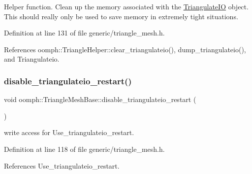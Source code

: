 Helper function. Clean up the memory associated with the \hyperlink{structoomph_1_1TriangulateIO}{Triangulate\+IO} object. This should really only be used to save memory in extremely tight situations. 



Definition at line 131 of file generic/triangle\+\_\+mesh.\+h.



References oomph\+::\+Triangle\+Helper\+::clear\+\_\+triangulateio(), dump\+\_\+triangulateio(), and Triangulateio.

\mbox{\label{classoomph_1_1TriangleMeshBase_a8f34ac9d3a8b7ee39a1134eadc47ff23}} 
\subsubsection{\texorpdfstring{disable\+\_\+triangulateio\+\_\+restart()}{disable\_triangulateio\_restart()}}
{\footnotesize\ttfamily void oomph\+::\+Triangle\+Mesh\+Base\+::disable\+\_\+triangulateio\+\_\+restart (\begin{DoxyParamCaption}{ }\end{DoxyParamCaption})\hspace{0.3cm}{\ttfamily [inline]}}



write access for Use\+\_\+triangulateio\+\_\+restart. 



Definition at line 118 of file generic/triangle\+\_\+mesh.\+h.



References Use\+\_\+triangulateio\+\_\+restart.

\mbox{\label{classoomph_1_1TriangleMeshBase_ad8e275d5f2528d9958964438086be8f4}} 
